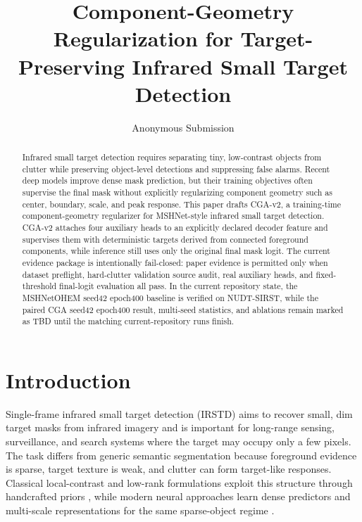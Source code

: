 \documentclass[letterpaper]{article}
\title{Component-Geometry Regularization for Target-Preserving Infrared Small Target Detection}
\author{Anonymous Submission}
\begin{document}
\maketitle

\begin{abstract}
Infrared small target detection requires separating tiny, low-contrast objects from clutter while preserving object-level detections and suppressing false alarms. Recent deep models improve dense mask prediction, but their training objectives often supervise the final mask without explicitly regularizing component geometry such as center, boundary, scale, and peak response. This paper drafts CGA-v2, a training-time component-geometry regularizer for MSHNet-style infrared small target detection. CGA-v2 attaches four auxiliary heads to an explicitly declared decoder feature and supervises them with deterministic targets derived from connected foreground components, while inference still uses only the original final mask logit. The current evidence package is intentionally fail-closed: paper evidence is permitted only when dataset preflight, hard-clutter validation source audit, real auxiliary heads, and fixed-threshold final-logit evaluation all pass. In the current repository state, the MSHNetOHEM seed42 epoch400 baseline is verified on NUDT-SIRST, while the paired CGA seed42 epoch400 result, multi-seed statistics, and ablations remain marked as TBD until the matching current-repository runs finish.
\end{abstract}

\section{Introduction}

Single-frame infrared small target detection (IRSTD) aims to recover small, dim target masks from infrared imagery and is important for long-range sensing, surveillance, and search systems where the target may occupy only a few pixels. The task differs from generic semantic segmentation because foreground evidence is sparse, target texture is weak, and clutter can form target-like responses. Classical local-contrast and low-rank formulations exploit this structure through handcrafted priors \citep{chen2014local,dai2017ript,zhang2019pstnn}, while modern neural approaches learn dense predictors and multi-scale representations for the same sparse-object regime \citep{wang2019miss,dai2021acm,dai2021alcnet,li2023dnanet}.
\end{document}
